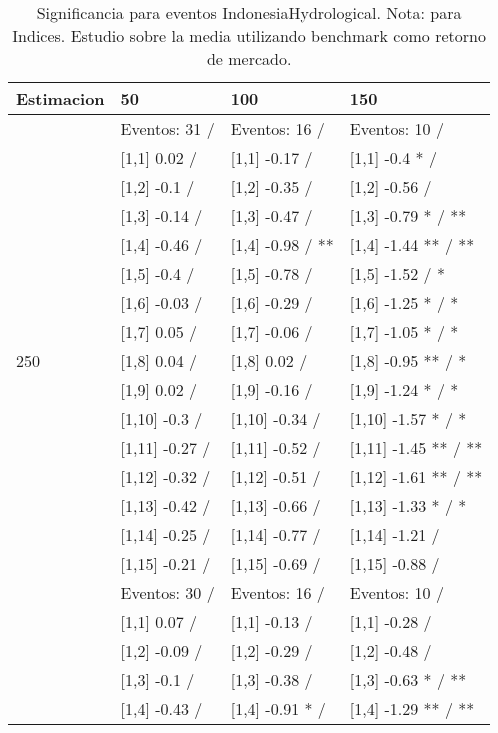 \begin{table}

\caption{Significancia para eventos IndonesiaHydrological. Nota: para Indices. Estudio sobre la media utilizando benchmark como retorno de mercado.}
\centering
\begin{tabular}[t]{llll}
\toprule
Estimacion & 50 & 100 & 150\\
\midrule
 & Eventos:  31 / & Eventos:  16 / & Eventos:  10 /\\
 & {}[1,1] 0.02  / & {}[1,1] -0.17  / & {}[1,1] -0.4 * /\\
 & {}[1,2] -0.1  / & {}[1,2] -0.35  / & {}[1,2] -0.56  /\\
 & {}[1,3] -0.14  / & {}[1,3] -0.47  / & {}[1,3] -0.79 * / **\\
 & {}[1,4] -0.46  / & {}[1,4] -0.98  / ** & {}[1,4] -1.44 ** / **\\
\addlinespace
 & {}[1,5] -0.4  / & {}[1,5] -0.78  / & {}[1,5] -1.52  / *\\
 & {}[1,6] -0.03  / & {}[1,6] -0.29  / & {}[1,6] -1.25 * / *\\
 & {}[1,7] 0.05  / & {}[1,7] -0.06  / & {}[1,7] -1.05 * / *\\
250 & {}[1,8] 0.04  / & {}[1,8] 0.02  / & {}[1,8] -0.95 ** / *\\
 & {}[1,9] 0.02  / & {}[1,9] -0.16  / & {}[1,9] -1.24 * / *\\
\addlinespace
 & {}[1,10] -0.3  / & {}[1,10] -0.34  / & {}[1,10] -1.57 * / *\\
 & {}[1,11] -0.27  / & {}[1,11] -0.52  / & {}[1,11] -1.45 ** / **\\
 & {}[1,12] -0.32  / & {}[1,12] -0.51  / & {}[1,12] -1.61 ** / **\\
 & {}[1,13] -0.42  / & {}[1,13] -0.66  / & {}[1,13] -1.33 * / *\\
 & {}[1,14] -0.25  / & {}[1,14] -0.77  / & {}[1,14] -1.21  /\\
\addlinespace
 & {}[1,15] -0.21  / & {}[1,15] -0.69  / & {}[1,15] -0.88  /\\
 & Eventos:  30 / & Eventos:  16 / & Eventos:  10 /\\
 & {}[1,1] 0.07  / & {}[1,1] -0.13  / & {}[1,1] -0.28  /\\
 & {}[1,2] -0.09  / & {}[1,2] -0.29  / & {}[1,2] -0.48  /\\
 & {}[1,3] -0.1  / & {}[1,3] -0.38  / & {}[1,3] -0.63 * / **\\
\addlinespace
 & {}[1,4] -0.43  / & {}[1,4] -0.91 * / & {}[1,4] -1.29 ** / **\\

\end{tabular}
\end{table}
